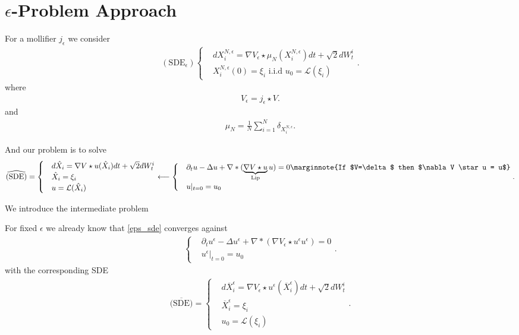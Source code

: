 \section{$\epsilon$-Problem Approach}
\begin{definition}\label{eps_sde}
  For a mollifier  $j_\epsilon$ we consider 
  \begin{align*}
  (\text{SDE}_\epsilon)\begin{cases}
    &dX_i^{N,\epsilon} = \nabla V_\epsilon \star  \mu_N(X_i^{N,\epsilon} ) dt + \sqrt{2}dW_t^i\\
    &X_i^{N,\epsilon}(0) = \xi_i \text{ i.i.d } u_{0}=\mathcal{L}(\xi_i)
  \end{cases}
.\end{align*}  
where 
\begin{align*}
  V_\epsilon = j_{\epsilon}\star V
.\end{align*}
and 
\begin{align*}
  \mu_N = \frac{1}{N} \sum_{i=1}^{N} \delta_{X_i^{N,\epsilon}}
.\end{align*}
\end{definition}
\begin{definition}
 And our problem is to solve 
\begin{align*}
  \widehat{\text{(SDE)}}=\begin{cases}
   &d \hat{X}_i = \nabla V \star  u(\hat{X}_i )  dt + \sqrt{2}dW_t^i\\
   &\hat{X}_i = \xi_i \\
   &u = \mathcal{L}(\hat{X}_i )
  \end{cases} 
  \longleftarrow\begin{cases}
  &\partial_t u - \Delta  u+ \nabla* (\underbrace{\nabla V \star  u}_{\text{Lip}} u) = 0 \marginnote{If $V=\delta $ then $\nabla V \star  u = u$}\\
  &u \rvert_{t=0} = u_{0}
  \end{cases}
.\end{align*}
\end{definition}
We introduce the intermediate problem 
\begin{definition}
For fixed $\epsilon$ we already know that \autoref{eps_sde} converges against 
\begin{align*}
  \begin{cases}
  &\partial_t u^{\epsilon}  - \Delta  u^{\epsilon} + \nabla* (\nabla V_\epsilon \star  u^{\epsilon}  u^{\epsilon} ) = 0 \\
  &u^{\epsilon}  \rvert_{t=0} = u_{0}
  \end{cases}
.\end{align*}
with the corresponding SDE 
\begin{align*}  
  \overline{\text{(SDE)}}=\begin{cases}
   &d \overline{X}_i^{\epsilon} = \nabla V_{\epsilon} \star  u^{\epsilon} (\overline{X}^{\epsilon} _i )  dt + \sqrt{2}dW_t^i\\
   &\overline{X}^{\epsilon} _i = \xi_i \\
   &u_{0} = \mathcal{L}(\xi_i )
  \end{cases}
.\end{align*}
\end{definition}
